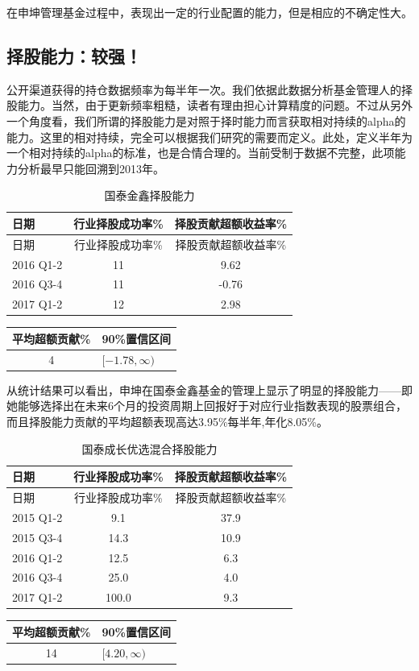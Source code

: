 \documentclass[hyperref,]{ctexart}
\begin{document}
在申坤管理基金过程中，表现出一定的行业配置的能力，但是相应的不确定性大。

\subsection{择股能力：较强！}

公开渠道获得的持仓数据频率为每半年一次。我们依据此数据分析基金管理人的择股能力。当然，由于更新频率粗糙，读者有理由担心计算精度的问题。不过从另外一个角度看，我们所谓的择股能力是对照于择时能力而言获取相对持续的alpha的能力。这里的相对持续，完全可以根据我们研究的需要而定义。此处，定义半年为一个相对持续的alpha的标准，也是合情合理的。当前受制于数据不完整，此项能力分析最早只能回溯到2013年。

\begin{longtable}[]{@{}lcc@{}}
\caption{国泰金鑫择股能力}\tabularnewline
\toprule
日期 & 行业择股成功率\% & 择股贡献超额收益率\%\tabularnewline
\midrule
\endfirsthead
\toprule
日期 & 行业择股成功率\% & 择股贡献超额收益率\%\tabularnewline
\midrule
\endhead
2016 Q1-2 & 11 & 9.62\tabularnewline
2016 Q3-4 & 11 & -0.76\tabularnewline
2017 Q1-2 & 12 & 2.98\tabularnewline
\bottomrule
\end{longtable}

\begin{longtable}[]{@{}cl@{}}
\toprule
平均超额贡献\% & 90\%置信区间\tabularnewline
\midrule
\endhead
4 & \([-1.78,\infty)\)\tabularnewline
\bottomrule
\end{longtable}

从统计结果可以看出，申坤在国泰金鑫基金的管理上显示了明显的择股能力------即她能够选择出在未来6个月的投资周期上回报好于对应行业指数表现的股票组合，而且择股能力贡献的平均超额表现高达3.95\%每半年,年化8.05\%。

\begin{longtable}[]{@{}lcc@{}}
\caption{国泰成长优选混合择股能力}\tabularnewline
\toprule
日期 & 行业择股成功率\% & 择股贡献超额收益率\%\tabularnewline
\midrule
\endfirsthead
\toprule
日期 & 行业择股成功率\% & 择股贡献超额收益率\%\tabularnewline
\midrule
\endhead
2015 Q1-2 & 9.1 & 37.9\tabularnewline
2015 Q3-4 & 14.3 & 10.9\tabularnewline
2016 Q1-2 & 12.5 & 6.3\tabularnewline
2016 Q3-4 & 25.0 & 4.0\tabularnewline
2017 Q1-2 & 100.0 & 9.3\tabularnewline
\bottomrule
\end{longtable}

\begin{longtable}[]{@{}cl@{}}
\toprule
平均超额贡献\% & 90\%置信区间\tabularnewline
\midrule
\endhead
14 & \([4.20,\infty)\)\tabularnewline
\bottomrule
\end{longtable}
\end{document}
